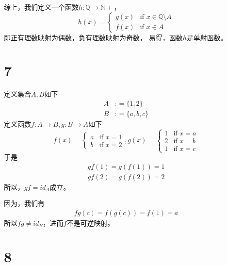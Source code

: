 \documentclass{article}
\begin{document}
综上，我们定义一个函数$h : \mathbb{Q} \to \mathbb{N}+$，
\begin{equation*}
      h(x) = \begin{cases}
            g(x) & \text{if } x \in \mathbb{Q} \setminus A \\
            f(x) & \text{if } x \in A
      \end{cases}
\end{equation*}
即正有理数映射为偶数，负有理数映射为奇数，
易得，函数$h$是单射函数。

\section*{7}

定义集合$A,B$如下
\begin{align*}
      A & : = \{1, 2\}    \\
      B & : = \{a, b, c\}
\end{align*}
定义函数$f: A \to B, g: B \to A$如下
\begin{equation*}
      f(x) = \begin{cases}
            a & \text{if } x = 1 \\
            b & \text{if } x = 2
      \end{cases},
      g(x) = \begin{cases}
            1 & \text{if } x = a \\
            2 & \text{if } x = b \\
            1 & \text{if } x = c
      \end{cases}
\end{equation*}
于是
\begin{align*}
      gf(1) = g(f(1)) = 1 \\
      gf(2) = g(f(2)) = 2
\end{align*}
所以，$gf = id_A$成立。

因为，我们有
\begin{align*}
      fg(c) = f(g(c)) = f(1) = a
\end{align*}
所以$fg \neq id_B$，进而$f$不是可逆映射。

\section*{8}
\end{document}
